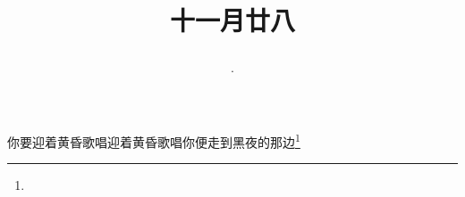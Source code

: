 \title{\date[d=28,m=12,y=2024][year:cn-y,年,month:cn,day:cn,日,·,weekday]·十一月廿八 }
你要迎着黄昏歌唱迎着黄昏歌唱你便走到黑夜的那边\footnote{ }

